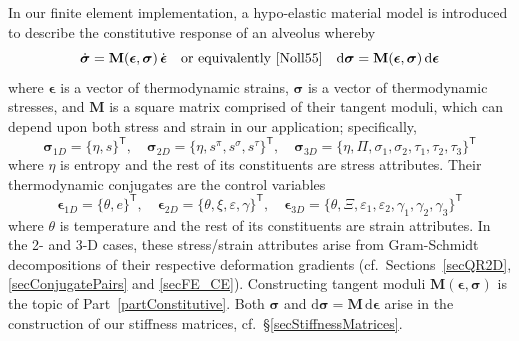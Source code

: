 In our finite element implementation, a hypo-elastic material model \cite{Truesdell55} is introduced to describe the constitutive response of an alveolus whereby
\begin{displaymath}
    \dot{\boldsymbol{\sigma}} = \mathbf{M} ( \boldsymbol{\epsilon} , \boldsymbol{\sigma} ) \, \dot{\boldsymbol{\epsilon}} 
    \quad \text{or equivalently \cite{Noll55}} \quad
    \mathrm{d} \boldsymbol{\sigma} = \mathbf{M} ( \boldsymbol{\epsilon} , \boldsymbol{\sigma} ) \, \mathrm{d} \boldsymbol{\epsilon}
\end{displaymath} 
where $\boldsymbol{\epsilon}$ is a vector of thermo\-dynamic strains, $\boldsymbol{\sigma}$ is a vector of thermo\-dynamic stresses, and $\mathbf{M}$ is a square matrix comprised of their tangent moduli, which can depend upon both stress and strain in our application; specifically,
\begin{displaymath}
   \boldsymbol{\sigma}_{1D} = \{ \eta , s \}^{\mathsf{T}} , \quad
   \boldsymbol{\sigma}_{2D} = \{ \eta , s^{\pi} , s^{\sigma} , s^{\tau} \}^{\mathsf{T}} , \quad
   \boldsymbol{\sigma}_{3D} = \{ \eta , \Pi , \sigma_1 , \sigma_2 , \tau_1 , \tau_2 , \tau_3 \}^{\mathsf{T}}
\end{displaymath}
where $\eta$ is entropy and the rest of its constituents are stress attributes.  Their thermo\-dynamic conjugates are the control variables
\begin{displaymath}
\boldsymbol{\epsilon}_{1D} = \{ \theta , e \}^{\mathsf{T}} , \quad
\boldsymbol{\epsilon}_{2D} = \{ \theta , \xi , \varepsilon , \gamma \}^{\mathsf{T}} , \quad
\boldsymbol{\epsilon}_{3D} = \{ \theta , \Xi , \varepsilon_1 , \varepsilon_2 , \gamma_1 , \gamma_2 , \gamma_3 \}^{\mathsf{T}}
\end{displaymath}
where $\theta$ is temperature and the rest of its constituents are strain attributes.  In the 2- and 3-D cases, these stress\slash strain attributes arise from Gram-Schmidt decompositions of their respective deformation gradients (cf.\ Sections~\ref{secQR2D}, \ref{secConjugatePairs} and \ref{secFE_CE}).  Constructing tangent moduli $\mathbf{M} ( \boldsymbol{\epsilon} , \boldsymbol{\sigma} )$ is the topic of Part~\ref{partConstitutive}.  Both $\boldsymbol{\sigma}$ and $\mathrm{d} \boldsymbol{\sigma} = \mathbf{M} \, \mathrm{d} \boldsymbol{\epsilon}$ arise in the construction of our stiffness matrices, cf.\ \S\ref{secStiffnessMatrices}.

